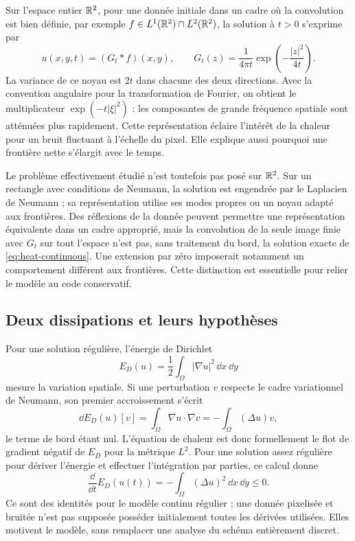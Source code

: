 Sur l'espace entier $\mathbb{R}^2$, pour une donnée initiale dans un cadre où la
convolution est bien définie, par exemple $f\in L^1(\mathbb{R}^2)\cap L^2(\mathbb{R}^2)$,
la solution à $t>0$ s'exprime par
\begin{equation}
 u(x,y,t)=(G_t*f)(x,y),\qquad
 G_t(z)=\frac{1}{4\pi t}\exp\left(-\frac{|z|^2}{4t}\right).
 \label{eq:heat-gaussian}
\end{equation}
La variance de ce noyau est $2t$ dans chacune des deux directions.
Avec la convention angulaire pour la transformation de Fourier,
on obtient le multiplicateur
$\exp(-t|\xi|^2)$ : les composantes de grande fréquence spatiale sont
atténuées plus rapidement. Cette représentation éclaire l'intérêt de la
chaleur pour un bruit fluctuant à l'échelle du pixel. Elle explique aussi
pourquoi une frontière nette s'élargit avec le temps.

Le problème effectivement étudié n'est toutefois pas posé sur $\mathbb{R}^2$.
Sur un rectangle avec conditions de Neumann, la solution est engendrée
par le Laplacien de Neumann ; sa représentation utilise ses modes propres
ou un noyau adapté aux frontières. Des réflexions de la donnée peuvent
permettre une représentation équivalente dans un cadre approprié, mais
la convolution de la seule image finie avec $G_t$ sur tout l'espace
n'est pas, sans traitement du bord, la solution exacte de
\eqref{eq:heat-continuous}. Une extension par zéro imposerait notamment
un comportement différent aux frontières. Cette distinction est
essentielle pour relier le modèle au code conservatif.

\subsection{Deux dissipations et leurs hypothèses}

Pour une solution régulière, l'énergie de Dirichlet
\begin{equation}
 E_D(u)=\frac12\int_\Omega |\nabla u|^2\,\dd x\,\dd y
 \label{eq:dirichlet-energy}
\end{equation}
mesure la variation spatiale. Si une perturbation $v$ respecte le cadre
variationnel de Neumann, son premier accroissement s'écrit
\begin{equation}
 \dd E_D(u)[v]
 =\int_\Omega \nabla u\cdot\nabla v
 =-\int_\Omega (\Delta u)v,
 \label{eq:dirichlet-firstvariation}
\end{equation}
le terme de bord étant nul. L'équation de chaleur est donc formellement
le flot de gradient négatif de $E_D$ pour la métrique $L^2$.
Pour une solution assez régulière pour dériver l'énergie et effectuer
l'intégration par parties, ce calcul donne
\begin{equation}
 \frac{\dd}{\dd t}E_D(u(t))
 =-\int_\Omega (\Delta u)^2\,\dd x\,\dd y\leq0.
 \label{eq:dirichlet-dissipation}
\end{equation}
Ce sont des identités pour le modèle continu régulier ; une donnée
pixelisée et bruitée n'est pas supposée posséder initialement toutes
les dérivées utilisées. Elles motivent le modèle, sans remplacer une
analyse du schéma entièrement discret.

